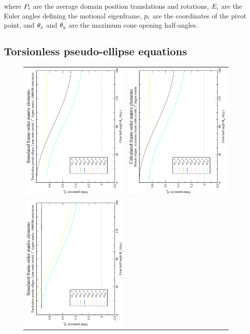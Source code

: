 where $P_i$ are the average domain position translations and rotations, $E_i$ are the Euler angles defining the motional eigenframe, $p_i$ are the coordinates of the pivot point, and $\theta_x$ and $\theta_y$ are the maximum cone opening half-angles.


\subsection{Torsionless pseudo-ellipse equations}

\begin{figure}
\centering
  \begin{tabular}{@{}cc@{}}
    \includegraphics[width=.35\textwidth,angle=270]{images/frame_order_matrix/Sij_pseudo-ellipse_torsionless_in_frame_theta_x_ens1000000.eps} &
    \includegraphics[width=.35\textwidth,angle=270]{images/frame_order_matrix/Sij_pseudo-ellipse_torsionless_in_frame_theta_x_calc.eps} \\
    \\[-5pt]
    \includegraphics[width=.35\textwidth,angle=270]{images/frame_order_matrix/Sij_pseudo-ellipse_torsionless_in_frame_theta_y_ens1000000.eps} &

\end{tabular}
\end{figure}
